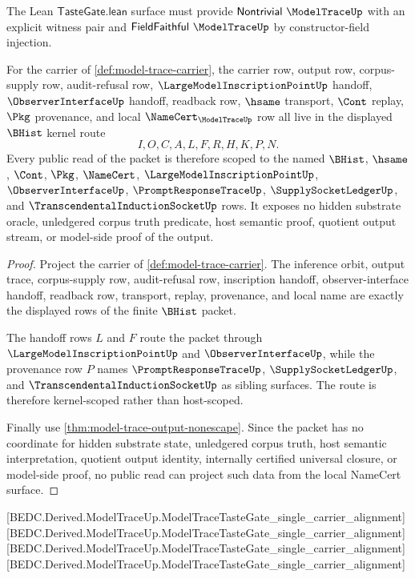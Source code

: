 The Lean $\mathsf{TasteGate.lean}$ surface must provide $\mathsf{Nontrivial}\ \ModelTraceUp$ with an explicit witness pair and $\mathsf{FieldFaithful}\ \ModelTraceUp$ by constructor-field injection.

\begin{theorem}
\label{thm:model-trace-kernel-scope-package}
For the carrier of \autoref{def:model-trace-carrier}, the carrier row, output row, corpus-supply row, audit-refusal row, $\LargeModelInscriptionPointUp$ handoff, $\ObserverInterfaceUp$ handoff, readback row, $\hsame$ transport, $\Cont$ replay, $\Pkg$ provenance, and local $\NameCert_{\ModelTraceUp}$ row all live in the displayed $\BHist$ kernel route
$$
I,O,C,A,L,F,R,H,K,P,N .
$$
Every public read of the packet is therefore scoped to the named $\BHist$, $\hsame$, $\Cont$, $\Pkg$, $\NameCert$, $\LargeModelInscriptionPointUp$, $\ObserverInterfaceUp$, $\PromptResponseTraceUp$, $\SupplySocketLedgerUp$, and $\TranscendentalInductionSocketUp$ rows. It exposes no hidden substrate oracle, unledgered corpus truth predicate, host semantic proof, quotient output stream, or model-side proof of the output.
\end{theorem}
\begin{proof}
Project the carrier of \autoref{def:model-trace-carrier}. The inference orbit, output trace, corpus-supply row, audit-refusal row, inscription handoff, observer-interface handoff, readback row, transport, replay, provenance, and local name are exactly the displayed rows of the finite $\BHist$ packet.

The handoff rows $L$ and $F$ route the packet through $\LargeModelInscriptionPointUp$ and $\ObserverInterfaceUp$, while the provenance row $P$ names $\PromptResponseTraceUp$, $\SupplySocketLedgerUp$, and $\TranscendentalInductionSocketUp$ as sibling surfaces. The route is therefore kernel-scoped rather than host-scoped.

Finally use \autoref{thm:model-trace-output-nonescape}. Since the packet has no coordinate for hidden substrate state, unledgered corpus truth, host semantic interpretation, quotient output identity, internally certified universal closure, or model-side proof, no public read can project such data from the local NameCert surface.
\end{proof}

[BEDC.Derived.ModelTraceUp.ModelTraceTasteGate\_single\_carrier\_alignment]
[BEDC.Derived.ModelTraceUp.ModelTraceTasteGate\_single\_carrier\_alignment]
[BEDC.Derived.ModelTraceUp.ModelTraceTasteGate\_single\_carrier\_alignment]
[BEDC.Derived.ModelTraceUp.ModelTraceTasteGate\_single\_carrier\_alignment]

